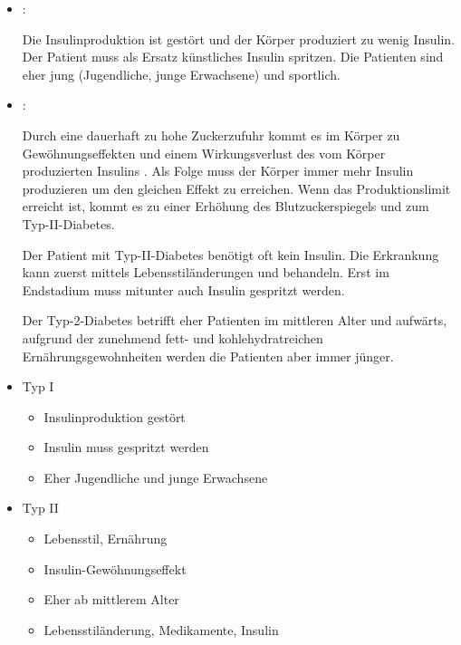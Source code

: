 {{}{}{}{}







{
\begin{itemize}
  \item {}:   
  
  Die Insulinproduktion ist gestört
  und der Körper produziert zu wenig Insulin. Der Patient
  muss als Ersatz künstliches Insulin spritzen.  Die Patienten
  sind eher jung (Jugendliche, junge Erwachsene) und
  sportlich.
  
  
  \item {}:
  
  Durch eine
  dauerhaft zu hohe Zuckerzufuhr kommt es im Körper zu
  Gewöhnungseffekten und einem Wirkungsverlust des vom
  Körper produzierten Insulins . Als
  Folge muss der Körper immer mehr Insulin produzieren um
  den gleichen Effekt zu erreichen. Wenn das
  Produktionslimit erreicht ist, kommt es zu einer Erhöhung
  des Blutzuckerspiegels und zum Typ-II-Diabetes.
  
  Der Patient mit Typ-II-Diabetes benötigt oft kein Insulin.
  Die Erkrankung kann zuerst mittels Lebensstiländerungen
  und  behandeln. Erst im Endstadium muss
  mitunter auch Insulin gespritzt werden.
  
  Der Typ-2-Diabetes betrifft eher Patienten im mittleren
  Alter und aufwärts, aufgrund der zunehmend fett- und
  kohlehydratreichen Ernährungsgewohnheiten werden die
  Patienten aber immer jünger.
\end{itemize}
}{
\begin{itemize}
  \item Typ I
  \begin{itemize}
    \item Insulinproduktion gestört
    \item Insulin muss gespritzt werden
    \item Eher Jugendliche und junge Erwachsene
  \end{itemize}
  \item Typ II
  \begin{itemize}
    \item Lebensstil, Ernährung
    \item Insulin-Gewöhnungseffekt
    \item Eher ab mittlerem Alter
    \item Lebensstiländerung, Medikamente, Insulin
  \end{itemize}
\end{itemize}
}{}{}{}


}
